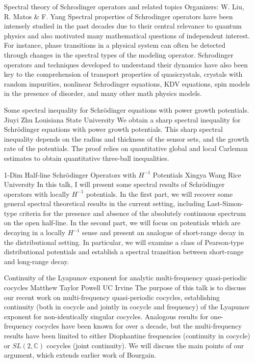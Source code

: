 \label{mini07}

\miniabs
{Spectral theory of Schrodinger operators and related topics}
{Organizers: W. Liu, R. Matos \& F. Yang}
{Spectral properties of Schrodinger operators have been intensely studied in the past decades due to their central relevance to quantum physics and also motivated many mathematical questions of independent interest. For instance, phase transitions in a physical system can often be detected through changes in the spectral types of the modeling operator. Schrodinger operators and techniques developed to understand their dynamics have also been key to the comprehension of transport properties of quasicrystals, crystals with random impurities, nonlinear Schrodinger equations, KDV equations, spin models in the presence of disorder, and many other math physics models.}

\vspace{2ex}
\abs
{Some spectral inequality for Schrödinger equations with power growth potentials.}
{Jiuyi Zhu}
{Louisiana State University}
{
We obtain a sharp spectral inequality for Schrödinger equations with power growth potentials. This sharp spectral inequality depends on the radius and thickness of the sensor sets, and the growth rate of the potentials. The proof relies on quantitative global and local Carleman estimates to obtain quantitative three-ball inequalities.}


\vspace{1.5ex}
\abs
{1-Dim Half-line Schrödinger Operators with $H^{-1}$ Potentials}
{Xingya Wang}
{Rice University}
{In this talk, I will present some spectral results of Schrödinger operators with locally $H^{-1}$ potentials. In the first part, we will recover some general spectral theoretical results in the current setting, including Last-Simon-type criteria for the presence and absence of the absolutely continuous spectrum on the open half-line. In the second part, we will focus on potentials which are decaying in a locally $H^{-1}$ sense and present an analogue of short-range decay in the distributional setting. In particular, we will examine a class of Pearson-type distributional potentials and establish a spectral transition between short-range and long-range decay.}


\vspace{1.5ex}
\abs
{Continuity of the Lyapunov exponent for analytic multi-frequency quasi-periodic cocycles}
{Matthew Taylor Powell}
{UC Irvine}
{
The purpose of this talk is to discuss our recent work on multi-frequency quasi-periodic cocycles, establishing continuity (both in cocycle and jointly in cocycle and frequency) of the Lyapunov exponent for non-identically singular cocycles. Analogous results for one-frequency cocycles have been known for over a decade, but the multi-frequency results have been limited to either Diophantine frequencies (continuity in cocycle) or $SL(2,\mathbb C)$ cocycles (joint continuity). We will discuss the main points of our argument, which extends earlier work of Bourgain.}


